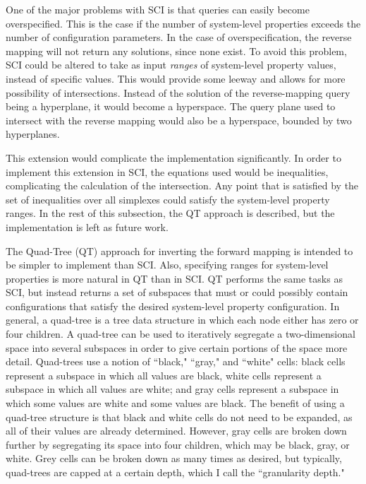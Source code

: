 One of the major problems with SCI is that queries can easily become overspecified.
This is the case if the number of system-level properties exceeds the number of configuration parameters.
In the case of overspecification, the reverse mapping will not return any solutions, since none exist.
To avoid this problem, SCI could be altered to take as input \textit{ranges} of system-level property values, instead of specific values.
This would provide some leeway and allows for more possibility of intersections.
Instead of the solution of the reverse-mapping query being a hyperplane, it would become a hyperspace.
The query plane used to intersect with the reverse mapping would also be a hyperspace, bounded by two hyperplanes.

This extension would complicate the implementation significantly.
In order to implement this extension in SCI, the equations used would be inequalities, complicating the calculation of the intersection.
Any point that is satisfied by the set of inequalities over all simplexes could satisfy the system-level property ranges.
In the rest of this subsection, the QT approach is described, but the implementation is left as future work.

The Quad-Tree (QT) approach for inverting the forward mapping is intended to be simpler to implement than SCI.
Also, specifying ranges for system-level properties is more natural in QT than in SCI.
QT performs the same tasks as SCI, but instead returns a set of subspaces that must or could possibly contain configurations that satisfy the desired system-level property configuration.
In general, a quad-tree is a tree data structure in which each node either has zero or four children.
A quad-tree can be used to iteratively segregate a two-dimensional space into several subspaces in order to give certain portions of the space more detail.
Quad-trees use a notion of ``black," ``gray," and ``white" cells: black cells represent a subspace in which all values are black, white cells represent a subspace in which all values are white; and gray cells represent a subspace in which some values are white and some values are black.
The benefit of using a quad-tree structure is that black and white cells do not need to be expanded, as all of their values are already determined.
However, gray cells are broken down further by segregating its space into four children, which may be black, gray, or white.
Grey cells can be broken down as many times as desired, but typically, quad-trees are capped at a certain depth, which I call the ``granularity depth."

